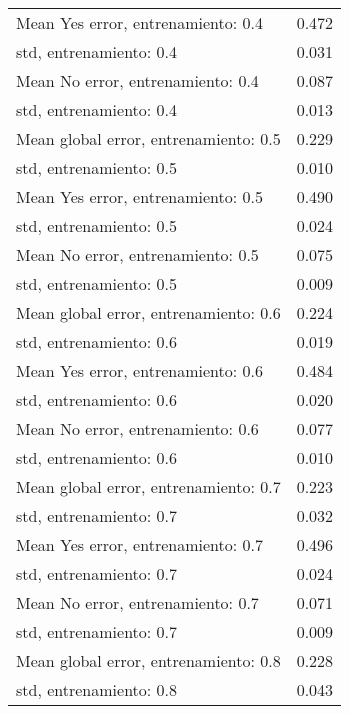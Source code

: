 \begin{longtable}{p{4cm}|p{1.5cm}}
Mean Yes error, entrenamiento: 0.4    &                        0.472 \\
std, entrenamiento: 0.4               &                        0.031 \\
Mean No error, entrenamiento: 0.4     &                        0.087 \\
std, entrenamiento: 0.4               &                        0.013 \\
Mean global error, entrenamiento: 0.5 &                        0.229 \\
std, entrenamiento: 0.5               &                        0.010 \\
Mean Yes error, entrenamiento: 0.5    &                        0.490 \\
std, entrenamiento: 0.5               &                        0.024 \\
Mean No error, entrenamiento: 0.5     &                        0.075 \\
std, entrenamiento: 0.5               &                        0.009 \\
Mean global error, entrenamiento: 0.6 &                        0.224 \\
std, entrenamiento: 0.6               &                        0.019 \\
Mean Yes error, entrenamiento: 0.6    &                        0.484 \\
std, entrenamiento: 0.6               &                        0.020 \\
Mean No error, entrenamiento: 0.6     &                        0.077 \\
std, entrenamiento: 0.6               &                        0.010 \\
Mean global error, entrenamiento: 0.7 &                        0.223 \\
std, entrenamiento: 0.7               &                        0.032 \\
Mean Yes error, entrenamiento: 0.7    &                        0.496 \\
std, entrenamiento: 0.7               &                        0.024 \\
Mean No error, entrenamiento: 0.7     &                        0.071 \\
std, entrenamiento: 0.7               &                        0.009 \\
Mean global error, entrenamiento: 0.8 &                        0.228 \\
std, entrenamiento: 0.8               &                        0.043 \\

\end{longtable}
